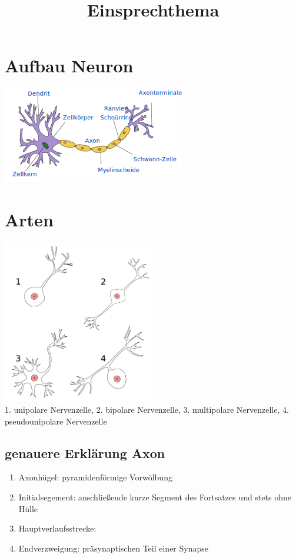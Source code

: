 \documentclass[12pt,a4paper]{article}
\title{Einsprechthema}
\author{}
\date{}
\begin{document}
\begin{titlepage}

\maketitle
\thispagestyle{empty}
\end{titlepage}
\newpage

\section{Aufbau Neuron}
\includegraphics[width=0.6\textwidth]{tmp_pix/neuron.png}

\section{Arten}
\includegraphics[width=0.5\textwidth]{tmp_pix/kinds_of_neuron.png}\\
1. unipolare Nervenzelle, 2. bipolare Nervenzelle, 3. multipolare Nervenzelle, 4. pseudounipolare Nervenzelle\\

\subsection{genauere Erklärung Axon}
\begin{enumerate}
	\item Axonhügel: pyramidenförmige Vorwölbung
	\item Initialsegement: anschließende kurze Segment des Fortsatzes und stets ohne Hülle
	\item Hauptverlaufsstrecke:
	\item Endverzweigung: präsynaptischen Teil einer Synapse
\end{enumerate}
\end{document}
